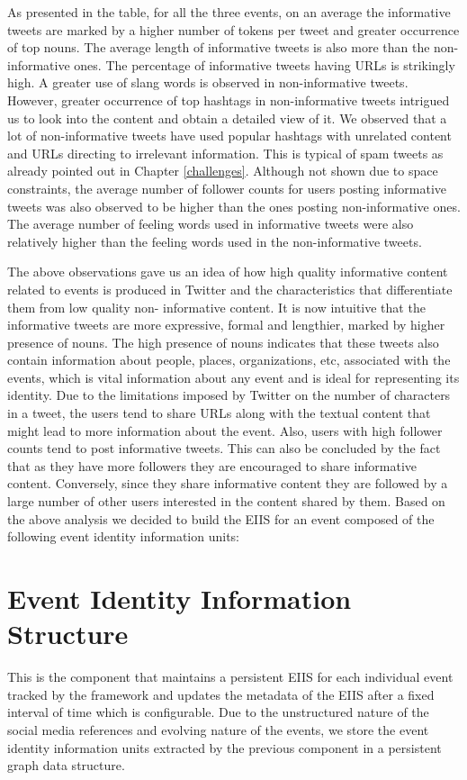 As presented in the table, for all the three events, on an average the informative tweets are marked by a higher number of tokens per tweet and greater occurrence of top nouns. The average length of informative tweets is also more than the non-informative ones. The percentage of informative tweets having URLs is strikingly high. A greater use of slang words is observed in non-informative tweets. However, greater occurrence of top hashtags in non-informative tweets intrigued us to look into the content and obtain a detailed view of it. We observed that a lot of non-informative tweets have used popular hashtags with unrelated content and URLs directing to irrelevant information. This is typical of spam tweets as already pointed out in Chapter \ref{challenges}. Although not shown due to space constraints, the average number of follower counts for users posting informative tweets was also observed to be higher than the ones posting non-informative ones. The average number of feeling words used in informative tweets were also relatively higher than the feeling words used in the non-informative tweets. 

The above observations gave us an idea of how high quality informative content related to events is produced in Twitter and the characteristics that differentiate them from low quality non- informative content. It is now intuitive that the informative tweets are more expressive, formal and lengthier, marked by higher presence of nouns. The high presence of nouns indicates that these tweets also contain information about people, places, organizations, etc, associated with the events, which is vital information about any event and is ideal for representing its identity. Due to the limitations imposed by Twitter on the number of characters in a tweet, the users tend to share URLs along with the textual content that might lead to more information about the event. Also, users with high follower counts tend to post informative tweets. This can also be concluded by the fact that as they have more followers they are encouraged to share informative content. Conversely, since they share informative content they are followed by a large number of other users interested in the content shared by them.
Based on the above analysis we decided to build the EIIS for an event composed of the following event identity information units:



\section{Event Identity Information Structure}
This is the component that maintains a persistent EIIS for each individual event tracked by the framework and updates the metadata of the EIIS after a fixed interval of time which is configurable. Due to the unstructured nature of the social media references and evolving nature of the events, we store the event identity information units extracted by the previous component in a persistent graph data structure.


